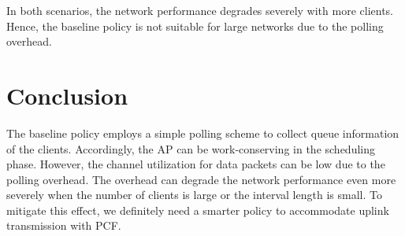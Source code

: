 \documentclass{article}
\begin{document}
In both scenarios, the network performance degrades severely with more clients. Hence, the baseline policy is not suitable for large networks due to the polling overhead. 

\section{Conclusion}
The baseline policy employs a simple polling scheme to collect queue information of the clients. Accordingly, the AP can be work-conserving in the scheduling phase. However, the channel utilization for data packets can be low due to the polling overhead. The overhead can degrade the network performance even more severely when the number of clients is large or the interval length is small. To mitigate this effect, we definitely need a smarter policy to accommodate uplink transmission with PCF.
\end{document}
